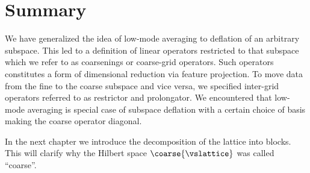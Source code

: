 \section{Summary}
\label{sec:sd:summary}

We have generalized the idea of low-mode averaging to deflation of an arbitrary subspace.
This led to a definition of linear operators restricted to that subspace which we refer to as coarsenings or coarse-grid operators.
Such operators constitutes a form of dimensional reduction via feature projection.
To move data from the fine to the coarse subspace and vice versa, we specified inter-grid operators referred to as restrictor and prolongator.
We encountered that low-mode averaging is special case of subspace deflation with a certain choice of basis making the coarse operator diagonal.

In the next chapter we introduce the decomposition of the lattice into blocks.
This will clarify why the Hilbert space $\coarse{\vslattice}$ was called ``coarse''.


